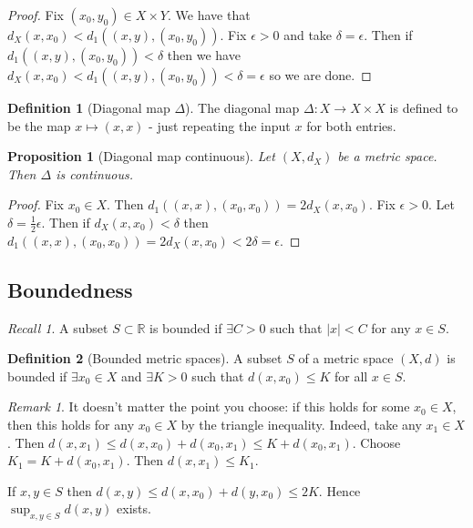 \documentclass{article}
\theoremstyle{definition}
\newtheorem{defn}{Definition}[section]
\theoremstyle{plain}%
\newtheorem{prop}[thm]{Proposition}
\theoremstyle{remark}
\newtheorem*{rem}{Remark}
\newtheorem*{rec}{Recall}
\begin{document}
\begin{proof}
Fix $(x_0, y_0) \in X \times Y$. We have that $d_X(x, x_0) < d_1((x,y), (x_0, y_0))$. Fix $\epsilon > 0$ and take $\delta = \epsilon$. Then if $ d_1((x,y), (x_0, y_0)) < \delta$ then we have  $d_X(x, x_0) < d_1((x,y), (x_0, y_0)) < \delta = \epsilon$ so we are done.
\end{proof}

\begin{defn}[Diagonal map $\Delta$]
The diagonal map $\Delta : X \to X \times X$ is defined to be the map $x \mapsto (x,x)$ - just repeating the input $x$ for both entries.
\end{defn}

\begin{prop}[Diagonal map continuous]
Let $(X, d_X)$ be a metric space. Then $\Delta$ is continuous.
\end{prop}

\begin{proof}
Fix $x_0 \in X$. Then $d_1((x,x), (x_0,x_0)) = 2d_X(x, x_0)$. Fix $\epsilon > 0$. Let $\delta = \frac{1}{2}\epsilon$. Then if $d_X(x, x_0) < \delta$ then $d_1((x,x), (x_0,x_0)) = 2d_X(x, x_0) < 2\delta = \epsilon$.
\end{proof}

\subsection{Boundedness}

\begin{rec}
A subset $S \subset \mathbb{R}$ is bounded if $\exists C > 0$ such that $|x| < C$ for any $x \in S$.
\end{rec}

\begin{defn}[Bounded metric spaces]
A subset $S$ of a metric space $(X, d)$ is bounded if $\exists x_0 \in X$ and $\exists K > 0$ such that $d(x, x_0) \le K$ for all $x \in S$.
\end{defn}

\begin{rem}
It doesn't matter the point you choose: if this holds for some $x_0 \in X$, then this holds for any $x_0 \in X$ by the triangle inequality. Indeed, take any $x_1 \in X$. Then $d(x, x_1) \le d(x, x_0) + d(x_0, x_1) \le K + d(x_0, x_1)$. Choose $K_1 = K + d(x_0, x_1)$. Then $d(x, x_1) \le K_1$.

If $x,y \in S$ then $d(x,y) \le d(x,x_0) + d(y, x_0) \le 2K$. Hence $\sup_{x,y \in S} d(x,y)$ exists.
\end{rem}
\end{document}
